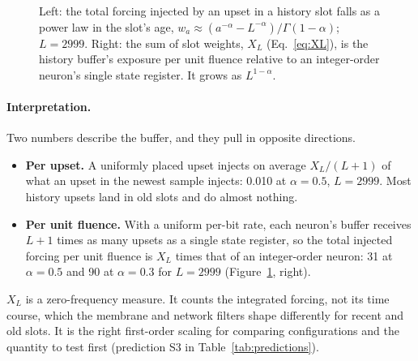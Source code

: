 \documentclass[11pt,a4paper]{article}
\begin{document}
\begin{figure}[h]
\caption{Left: the total forcing injected by an upset in a history slot falls as a power law in the slot's age, $w_a \approx (a^{-\alpha}-L^{-\alpha})/\Gamma(1-\alpha)$; $L = 2999$. Right: the sum of slot weights, $X_L$ (Eq.~\eqref{eq:XL}), is the history buffer's exposure per unit fluence relative to an integer-order neuron's single state register. It grows as $L^{1-\alpha}$.}
\label{fig:slots}
\end{figure}

\paragraph{Interpretation.} Two numbers describe the buffer, and they pull in opposite directions.
\begin{itemize}
  \item \textbf{Per upset.} A uniformly placed upset injects on average $X_L/(L+1)$ of what an upset in the newest sample injects: 0.010 at $\alpha = 0.5$, $L = 2999$. Most history upsets land in old slots and do almost nothing.
  \item \textbf{Per unit fluence.} With a uniform per-bit rate, each neuron's buffer receives $L+1$ times as many upsets as a single state register, so the total injected forcing per unit fluence is $X_L$ times that of an integer-order neuron: 31 at $\alpha = 0.5$ and 90 at $\alpha = 0.3$ for $L = 2999$ (Figure~\ref{fig:slots}, right).
\end{itemize}
$X_L$ is a zero-frequency measure. It counts the integrated forcing, not its time course, which the membrane and network filters shape differently for recent and old slots. It is the right first-order scaling for comparing configurations and the quantity to test first (prediction S3 in Table~\ref{tab:predictions}).
\end{document}
